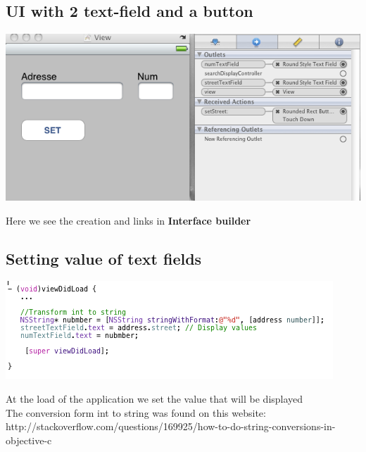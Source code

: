 \documentclass[a4paper,10pt]{article}
\begin{document}
			\subsection{UI with 2 text-field and a button}	
				\begin{center}
					\includegraphics[width=1\textwidth]{./images/createGraphic.png}
				\end{center}
				Here we see the creation and links in \textbf{Interface builder}
			\subsection{Setting value of text fields}	
					\begin{center}
						\includegraphics[scale=0.8]{./images/displayValue.png}
					\end{center}
				At the load of the application we set the value that will be displayed\\
				The conversion form int to string was found on this website: http://stackoverflow.com/questions/169925/how-to-do-string-conversions-in-objective-c
\end{document}
